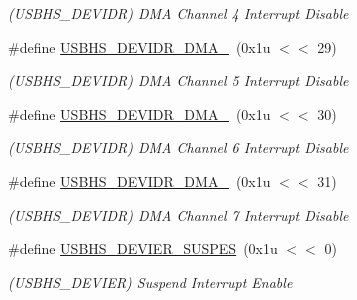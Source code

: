\begin{DoxyCompactItemize}
\begin{DoxyCompactList}\small\item\em (U\+S\+B\+H\+S\+\_\+\+D\+E\+V\+I\+DR) D\+MA Channel 4 Interrupt Disable \end{DoxyCompactList}\item 
\mbox{\label{group__SAMS70__USBHS_ga4cb9a975fc02e8ff3ebce0943b7d99ce}} 
\#define \mbox{\hyperlink{group__SAMS70__USBHS_ga4cb9a975fc02e8ff3ebce0943b7d99ce}{U\+S\+B\+H\+S\+\_\+\+D\+E\+V\+I\+D\+R\+\_\+\+D\+M\+A\+\_}}~(0x1u $<$$<$ 29)
\begin{DoxyCompactList}\small\item\em (U\+S\+B\+H\+S\+\_\+\+D\+E\+V\+I\+DR) D\+MA Channel 5 Interrupt Disable \end{DoxyCompactList}\item 
\mbox{\label{group__SAMS70__USBHS_gae7c9b7dc9158c83a2f29c2da518cd04d}} 
\#define \mbox{\hyperlink{group__SAMS70__USBHS_gae7c9b7dc9158c83a2f29c2da518cd04d}{U\+S\+B\+H\+S\+\_\+\+D\+E\+V\+I\+D\+R\+\_\+\+D\+M\+A\+\_}}~(0x1u $<$$<$ 30)
\begin{DoxyCompactList}\small\item\em (U\+S\+B\+H\+S\+\_\+\+D\+E\+V\+I\+DR) D\+MA Channel 6 Interrupt Disable \end{DoxyCompactList}\item 
\mbox{\label{group__SAMS70__USBHS_ga47114c490f9c49872eaec366836ae82a}} 
\#define \mbox{\hyperlink{group__SAMS70__USBHS_ga47114c490f9c49872eaec366836ae82a}{U\+S\+B\+H\+S\+\_\+\+D\+E\+V\+I\+D\+R\+\_\+\+D\+M\+A\+\_}}~(0x1u $<$$<$ 31)
\begin{DoxyCompactList}\small\item\em (U\+S\+B\+H\+S\+\_\+\+D\+E\+V\+I\+DR) D\+MA Channel 7 Interrupt Disable \end{DoxyCompactList}\item 
\mbox{\label{group__SAMS70__USBHS_ga5ad81ac99d74f1231b972e9750d6cb4a}} 
\#define \mbox{\hyperlink{group__SAMS70__USBHS_ga5ad81ac99d74f1231b972e9750d6cb4a}{U\+S\+B\+H\+S\+\_\+\+D\+E\+V\+I\+E\+R\+\_\+\+S\+U\+S\+P\+ES}}~(0x1u $<$$<$ 0)
\begin{DoxyCompactList}\small\item\em (U\+S\+B\+H\+S\+\_\+\+D\+E\+V\+I\+ER) Suspend Interrupt Enable \end{DoxyCompactList}\item 

\end{DoxyCompactItemize}
